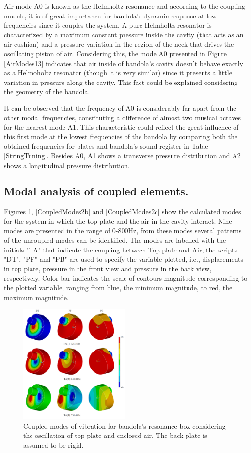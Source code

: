 Air mode A0 is known as the Helmholtz resonance and according to the coupling models, it is of great importance for bandola's dynamic response at low frequencies since it couples the system. A pure Helmholtz resonator is characterized by a maximum constant pressure inside the cavity (that acts as an air cushion) and a pressure variation in the region of the neck that drives the oscillating piston of air. Considering this, the mode A0 presented in Figure \ref{AirModes13} indicates that air inside of bandola's cavity doesn't behave exactly as a Helmoholtz resonator (though it is very similar) since it presents a little variation in pressure along the cavity. This fact could be explained considering the geometry of the bandola.

It can be observed that the frequency of A0 is considerably far apart from the other modal frequencies, constituting a difference of almost two musical octaves for the nearest mode A1. This characteristic could reflect the great influence of this first mode at the lowest frequencies of the bandola by comparing both the obtained frequencies for plates and bandola's sound register in Table \ref{StringTuning}. Besides A0, A1 shows a transverse pressure distribution and A2 shows a longitudinal pressure distribution.

\subsection{Modal analysis of coupled elements.}

Figures \ref{CoupledModes2a}, \ref{CoupledModes2b} and \ref{CoupledModes2c} show the calculated modes for the system in which the top plate and the air in the cavity interact. Nine modes are presented in the range of 0-800Hz, from these modes several patterns of the uncoupled modes can be identified. The modes are labelled with the initials "TA" that indicate the coupling between Top plate and Air, the scripts "DT", "PF" and "PB" are used to specify the variable plotted, i.e., displacements in top plate, pressure in the front view and pressure in the back view, respectively. Color bar indicates the scale of contours magnitude corresponding to the plotted variable, ranging from blue, the minimum magnitude, to red, the maximum magnitude.

\begin{figure}[h]
\centering
\includegraphics[height=6cm]{img/CoupledModes2a.png}
\caption{Coupled modes of vibration for bandola's resonance box considering the oscillation of top plate and enclosed air. The back plate is assumed to be rigid.}
\label{CoupledModes2a}
\end{figure}


